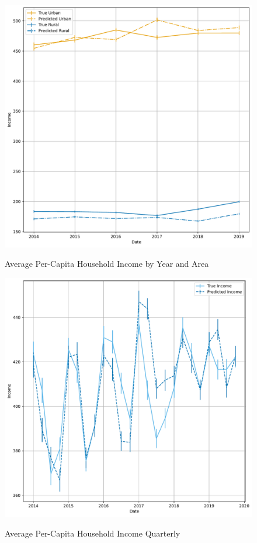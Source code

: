 \begin{figure}[H]
    \centering
    \caption{Average Per-Capita  Household Income by Year and Area}
    \includegraphics[width=\textwidth]{../figures/fig6_average_income_time_series_by_area.pdf}
    \label{fig:enter-label}
\end{figure}


\begin{figure}[H]
    \centering
    \caption{Average Per-Capita  Household Income Quarterly}
    \includegraphics[width=\textwidth]{../figures/fig7_average_income_time_series_quarterly.pdf}
    \label{fig:enter-label}
\end{figure}


